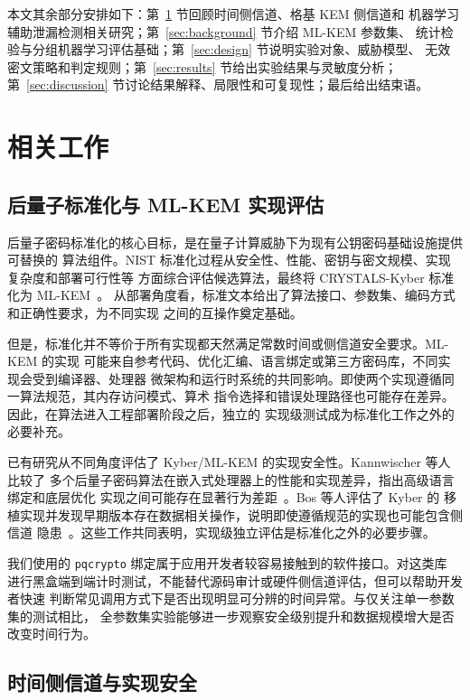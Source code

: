 \documentclass[a4paper,fontset=none]{ctexart}
\begin{document}
本文其余部分安排如下：第~\ref{sec:related} 节回顾时间侧信道、格基 KEM 侧信道和
机器学习辅助泄漏检测相关研究；第~\ref{sec:background} 节介绍 ML-KEM 参数集、
统计检验与分组机器学习评估基础；第~\ref{sec:design} 节说明实验对象、威胁模型、
无效密文策略和判定规则；第~\ref{sec:results} 节给出实验结果与灵敏度分析；
第~\ref{sec:discussion} 节讨论结果解释、局限性和可复现性；最后给出结束语。

\section{相关工作}
\label{sec:related}

\subsection{后量子标准化与 ML-KEM 实现评估}

后量子密码标准化的核心目标，是在量子计算威胁下为现有公钥密码基础设施提供可替换的
算法组件。NIST 标准化过程从安全性、性能、密钥与密文规模、实现复杂度和部署可行性等
方面综合评估候选算法，最终将 CRYSTALS-Kyber 标准化为 ML-KEM~\cite{FIPS203,Kyber2021}。
从部署角度看，标准文本给出了算法接口、参数集、编码方式和正确性要求，为不同实现
之间的互操作奠定基础。

但是，标准化并不等价于所有实现都天然满足常数时间或侧信道安全要求。ML-KEM 的实现
可能来自参考代码、优化汇编、语言绑定或第三方密码库，不同实现会受到编译器、处理器
微架构和运行时系统的共同影响。即使两个实现遵循同一算法规范，其内存访问模式、算术
指令选择和错误处理路径也可能存在差异。因此，在算法进入工程部署阶段之后，独立的
实现级测试成为标准化工作之外的必要补充。

已有研究从不同角度评估了 Kyber/ML-KEM 的实现安全性。Kannwischer 等人比较了
多个后量子密码算法在嵌入式处理器上的性能和实现差异，指出高级语言绑定和底层优化
实现之间可能存在显著行为差距~\cite{Kannwischer2019}。Bos 等人评估了 Kyber 的
移植实现并发现早期版本存在数据相关操作，说明即使遵循规范的实现也可能包含侧信道
隐患~\cite{Bos2018}。这些工作共同表明，实现级独立评估是标准化之外的必要步骤。

我们使用的 \texttt{pqcrypto} 绑定属于应用开发者较容易接触到的软件接口。对这类库
进行黑盒端到端计时测试，不能替代源码审计或硬件侧信道评估，但可以帮助开发者快速
判断常见调用方式下是否出现明显可分辨的时间异常。与仅关注单一参数集的测试相比，
全参数集实验能够进一步观察安全级别提升和数据规模增大是否改变时间行为。

\subsection{时间侧信道与实现安全}
\end{document}
